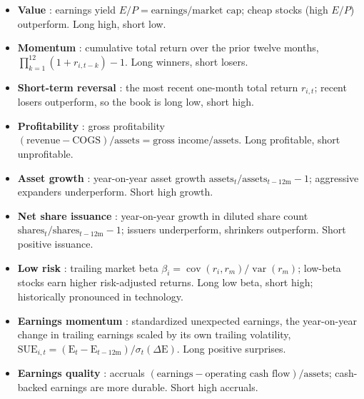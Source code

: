 \documentclass[11pt]{article}
\begin{document}
\begin{itemize}
  \item \textbf{Value} \citep{fama1992}: earnings yield $E/P=\text{earnings}/\text{market
  cap}$; cheap stocks (high $E/P$) outperform. Long high, short low.

  \item \textbf{Momentum} \citep{jegadeesh1993}: cumulative total return over the prior
  twelve months, $\prod_{k=1}^{12}(1+r_{i,t-k})-1$. Long winners, short losers.

  \item \textbf{Short-term reversal} \citep{jegadeesh1990}: the most recent one-month total
  return $r_{i,t}$; recent losers outperform, so the book is long low, short high.

  \item \textbf{Profitability} \citep{novymarx2013}: gross profitability
  $(\text{revenue}-\text{COGS})/\text{assets}=\text{gross income}/\text{assets}$. Long
  profitable, short unprofitable.

  \item \textbf{Asset growth} \citep{cooper2008}: year-on-year asset growth
  $\text{assets}_t/\text{assets}_{t-12\text{m}}-1$; aggressive expanders underperform. Short
  high growth.

  \item \textbf{Net share issuance} \citep{pontiff2008}: year-on-year growth in diluted
  share count $\text{shares}_t/\text{shares}_{t-12\text{m}}-1$; issuers underperform,
  shrinkers outperform. Short positive issuance.

  \item \textbf{Low risk} \citep{frazzini2014}: trailing market beta
  $\beta_i=\operatorname{cov}(r_i,r_m)/\operatorname{var}(r_m)$; low-beta stocks earn higher
  risk-adjusted returns. Long low beta, short high; historically pronounced in technology.

  \item \textbf{Earnings momentum} \citep{bernard1989}: standardized unexpected earnings,
  the year-on-year change in trailing earnings scaled by its own trailing volatility,
  $\text{SUE}_{i,t}=(\text{E}_t-\text{E}_{t-12\text{m}})/\sigma_t(\Delta\text{E})$. Long
  positive surprises.

  \item \textbf{Earnings quality} \citep{sloan1996}: accruals
  $(\text{earnings}-\text{operating cash flow})/\text{assets}$; cash-backed earnings are
  more durable. Short high accruals.
\end{itemize}
\end{document}
